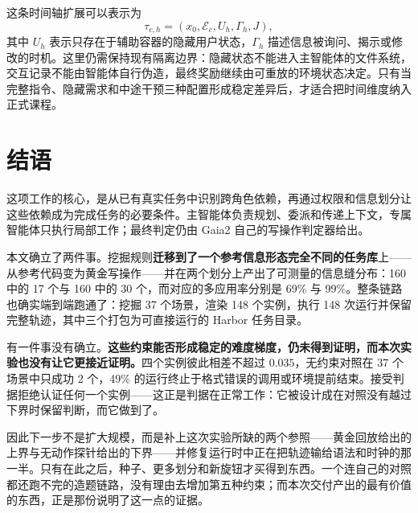 \documentclass[UTF8,11pt,fontset=fandol]{ctexart}
\begin{document}
这条时间轴扩展可以表示为
\[
  \tau_{c,h}=(x_0,\mathcal{E}_c,U_h,\Gamma_h,J),
\]
其中 $U_h$ 表示只存在于辅助容器的隐藏用户状态，$\Gamma_h$ 描述信息被询问、揭示或修改的时机。这里仍需保持现有隔离边界：隐藏状态不能进入主智能体的文件系统，交互记录不能由智能体自行伪造，最终奖励继续由可重放的环境状态决定。只有当完整指令、隐藏需求和中途干预三种配置形成稳定差异后，才适合把时间维度纳入正式课程。

\section{结语}

这项工作的核心，是从已有真实任务中识别跨角色依赖，再通过权限和信息划分让这些依赖成为完成任务的必要条件。主智能体负责规划、委派和传递上下文，专属智能体只执行局部工作；最终判定仍由 Gaia2 自己的写操作判定器给出。

本文确立了两件事。挖掘规则\textbf{迁移到了一个参考信息形态完全不同的任务库}上——从参考代码变为黄金写操作——并在两个划分上产出了可测量的信息缝分布：160 中的 17 个与 160 中的 30 个，而对应的多应用率分别是 69\% 与 99\%。整条链路也确实端到端跑通了：挖掘 37 个场景，渲染 148 个实例，执行 148 次运行并保留完整轨迹，其中三个打包为可直接运行的 Harbor 任务目录。

有一件事没有确立。\textbf{这些约束能否形成稳定的难度梯度，仍未得到证明，而本次实验也没有让它更接近证明。}四个实例彼此相差不超过 $0.035$，无约束对照在 37 个场景中只成功 2 个，49\% 的运行终止于格式错误的调用或环境提前结束。接受判据拒绝认证任何一个实例——这正是判据在正常工作：它被设计成在对照没有越过下界时保留判断，而它做到了。

因此下一步不是扩大规模，而是补上这次实验所缺的两个参照——黄金回放给出的上界与无动作探针给出的下界——并修复运行时中正在把轨迹输给语法和时钟的那一半。只有在此之后，种子、更多划分和新旋钮才买得到东西。一个连自己的对照都还跑不完的造题链路，没有理由去增加第五种约束；而本次交付产出的最有价值的东西，正是那份说明了这一点的证据。
\end{document}
